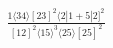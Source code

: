 \documentclass[varwidth, border=5pt]{standalone}
\begin{document}
\begin{my}
$\begin{gathered}
\scriptscriptstyle\frac{1⟨34⟩[23]^2⟨2|1+5|2]^2}{[12]^2⟨15⟩^3⟨25⟩[25]^2}
\end{gathered}$
\end{my}
\end{document}
